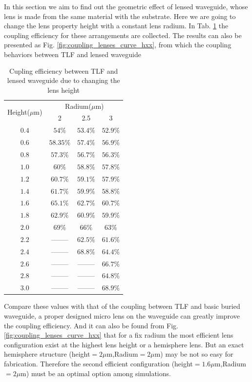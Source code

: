 
In this section we aim to find out the geometric effect of lensed waveguide, whose lens is made from the same material with the substrate. Here we are going to change the lens property height with a constant lens radium. In Tab. \ref{tab:coupling_lensed_waveguide_height} the coupling efficiency for these arrangements are collected. The results can also be presented as Fig. \ref{fig:coupling_lenses_curve_hxx}, from which the coupling behaviors between TLF and lensed waveguide    
\begin{table}
\caption{Cupling efficiency between TLF and lensed waveguide due to changing the lens height}
\centering
\begin{tabular}{|c|c|c|c|}
\hline
\multirow{2}{*}{Height($\mu$m)}&\multicolumn{3}{c|}{Radium($\mu$m)}\\
\cline{2-4}
 			&	2&	2.5&	3\\
\hline
$0.4$&$54\%$&$53.4\%$&$52.9\%$\\
$0.6$&$58.35\%$&$57.4\%$&$56.9\%$\\
$0.8$&$57.3\%$&$56.7\%$&$56.3\%$\\
$1.0$&$60\%$&$58.8\%$&$57.8\%$\\
$1.2$&$60.7\%$&$59.1\%$&$57.9\%$\\
$1.4$&$61.7\%$&$59.9\%$&$58.8\%$\\
$1.6$&$65.1\%$&$62.7\%$&$60.7\%$\\
$1.8$&$62.9\%$&$60.9\%$&$59.9\%$\\
$2.0$&$69\%$  &  $66\%$&$63\%$\\
$2.2$&--------&$62.5\%$&$61.6\%$\\
$2.4$&--------&$68.8\%$&$64.4\%$\\
$2.6$&--------&--------&$66.7\%$\\
$2.8$&--------&--------&$64.8\%$\\
$3.0$&--------&--------&$68.9\%$\\
\hline

\end{tabular}
\label{tab:coupling_lensed_waveguide_height}
\end{table}
Compare these values with that of the coupling between TLF and basic buried waveguide, a proper designed micro lens on the waveguide can greatly improve the coupling efficiency. And it can also be found from Fig. \ref{fig:coupling_lenses_curve_hxx} that for a fix radium the most efficient lens configuration exist at the highest lens height or a hemisphere lens. But an exact hemisphere structure (height$=2\mu$m,Radium$=2\mu$m) may be not so easy for fabrication. Therefore the second efficient configuration (height$=1.6\mu$m,Radium$=2\mu$m) must be  an optimal option among simulations. 
